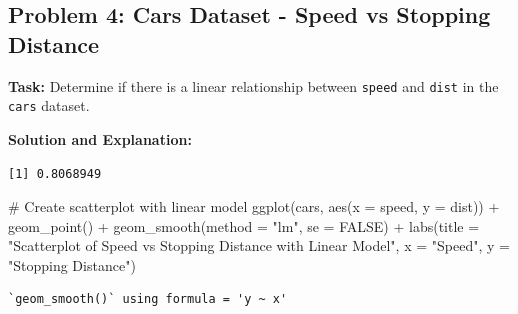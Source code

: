 \documentclass[
  letterpaper,
  DIV=11,
  numbers=noendperiod]{scrreprt}
\newenvironment{Shaded}{\begin{snugshade}}{\end{snugshade}}
\newcommand{\AttributeTok}[1]{\textcolor[rgb]{0.40,0.45,0.13}{#1}}
\newcommand{\CommentTok}[1]{\textcolor[rgb]{0.37,0.37,0.37}{#1}}
\newcommand{\ConstantTok}[1]{\textcolor[rgb]{0.56,0.35,0.01}{#1}}
\newcommand{\FunctionTok}[1]{\textcolor[rgb]{0.28,0.35,0.67}{#1}}
\newcommand{\NormalTok}[1]{\textcolor[rgb]{0.00,0.23,0.31}{#1}}
\newcommand{\OtherTok}[1]{\textcolor[rgb]{0.00,0.23,0.31}{#1}}
\newcommand{\SpecialCharTok}[1]{\textcolor[rgb]{0.37,0.37,0.37}{#1}}
\newcommand{\StringTok}[1]{\textcolor[rgb]{0.13,0.47,0.30}{#1}}
\begin{document}
\subsection*{Problem 4: Cars Dataset - Speed vs Stopping
Distance}\label{problem-4-cars-dataset---speed-vs-stopping-distance-1}

\textbf{Task:} Determine if there is a linear relationship between
\texttt{speed} and \texttt{dist} in the \texttt{cars} dataset.

\textbf{Solution and Explanation:}

\begin{Shaded}
\end{Shaded}

\begin{verbatim}
[1] 0.8068949
\end{verbatim}

\begin{Shaded}
\begin{Highlighting}[]
\CommentTok{\# Create scatterplot with linear model}
\FunctionTok{ggplot}\NormalTok{(cars, }\FunctionTok{aes}\NormalTok{(}\AttributeTok{x =}\NormalTok{ speed, }\AttributeTok{y =}\NormalTok{ dist)) }\SpecialCharTok{+}
  \FunctionTok{geom\_point}\NormalTok{() }\SpecialCharTok{+}
  \FunctionTok{geom\_smooth}\NormalTok{(}\AttributeTok{method =} \StringTok{"lm"}\NormalTok{, }\AttributeTok{se =} \ConstantTok{FALSE}\NormalTok{) }\SpecialCharTok{+}
  \FunctionTok{labs}\NormalTok{(}\AttributeTok{title =} \StringTok{"Scatterplot of Speed vs Stopping Distance with Linear Model"}\NormalTok{, }\AttributeTok{x =} \StringTok{"Speed"}\NormalTok{, }\AttributeTok{y =} \StringTok{"Stopping Distance"}\NormalTok{)}
\end{Highlighting}
\end{Shaded}

\begin{verbatim}
`geom_smooth()` using formula = 'y ~ x'
\end{verbatim}
\end{document}
